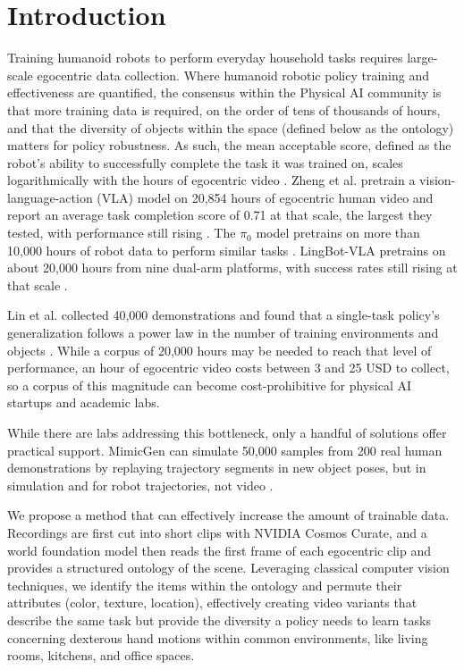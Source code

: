 \documentclass[runningheads]{llncs}
\begin{document}
\section{Introduction}

Training humanoid robots to perform everyday household tasks requires large-scale egocentric data collection. Where humanoid robotic policy training and effectiveness are quantified, the consensus within the Physical AI community is that more training data is required, on the order of tens of thousands of hours, and that the diversity of objects within the space (defined below as the ontology) matters for policy robustness. As such, the mean acceptable score, defined as the robot's ability to successfully complete the task it was trained on, scales logarithmically with the hours of egocentric video \cite{r1}. Zheng et al. pretrain a vision-language-action (VLA) model on 20,854 hours of egocentric human video and report an average task completion score of 0.71 at that scale, the largest they tested, with performance still rising \cite{r1}. The $\pi_0$ model pretrains on more than 10,000 hours of robot data to perform similar tasks \cite{r2}. LingBot-VLA pretrains on about 20,000 hours from nine dual-arm platforms, with success rates still rising at that scale \cite{r3}.

Lin et al. collected 40,000 demonstrations and found that a single-task policy's generalization follows a power law in the number of training environments and objects \cite{r4}. While a corpus of 20,000 hours may be needed to reach that level of performance, an hour of egocentric video costs between 3 and 25 USD to collect, so a corpus of this magnitude can become cost-prohibitive for physical AI startups and academic labs.

While there are labs addressing this bottleneck, only a handful of solutions offer practical support. MimicGen can simulate 50,000 samples from 200 real human demonstrations by replaying trajectory segments in new object poses, but in simulation and for robot trajectories, not video \cite{r5}.

We propose a method that can effectively increase the amount of trainable data. Recordings are first cut into short clips with NVIDIA Cosmos Curate, and a world foundation model then reads the first frame of each egocentric clip and provides a structured ontology of the scene. Leveraging classical computer vision techniques, we identify the items within the ontology and permute their attributes (color, texture, location), effectively creating video variants that describe the same task but provide the diversity a policy needs to learn tasks concerning dexterous hand motions within common environments, like living rooms, kitchens, and office spaces.
\end{document}
